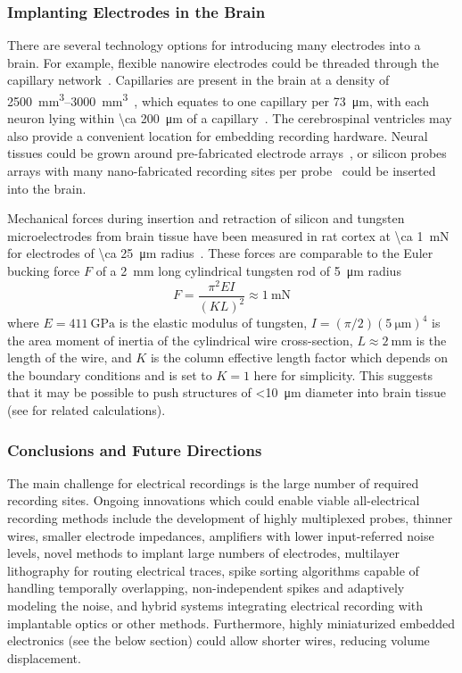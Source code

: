 \subsubsection{Implanting Electrodes in the Brain}

There are several technology options for introducing many electrodes into a brain.
For example, flexible nanowire electrodes could be threaded through the capillary network~\cite{llinas05}.
Capillaries are present in the brain at a density of \SIrange{2500}{3000}{\milli\meter\cubed}~\cite{schmidt89}, which equates to one capillary per \SI{73}{\micro\meter}, with each neuron lying within \SI{\ca 200}{\micro\meter} of a capillary~\cite{loffredo08}. 
The cerebrospinal ventricles may also provide a convenient location for embedding recording hardware.
Neural tissues could be grown around pre-fabricated electrode arrays~\cite{jadhav12}, or silicon probes arrays with many nano-fabricated recording sites per probe~\cite{du11} could be inserted into the brain.

Mechanical forces during insertion and retraction of silicon and tungsten microelectrodes from brain tissue have been measured in rat cortex at \SI{\ca 1}{\milli\newton} for electrodes of \SI{\ca 25}{\micro\meter} radius~\cite{jensen03}.
These forces are comparable to the Euler bucking force $F$ of a \SI{2}{\milli\meter} long cylindrical tungsten rod of \SI{5}{\micro\meter} radius
\[F=\frac{\pi^2 E I}{(K L)^2} \approx \SI{1}{\milli\newton}\]
where $E=\SI{411}{\giga\pascal}$ is the elastic modulus of tungsten, $I=(\pi/2)(\SI{5}{\micro\meter})^4$ is the area moment of inertia of the cylindrical wire cross-section, $L\approx\SI{2}{\milli\meter}$ is the length of the wire, and $K$ is the column effective length factor which depends on the boundary conditions and is set to $K=1$ here for simplicity.
This suggests that it may be possible to push structures of \SI{<10}{\micro\meter} diameter into brain tissue (see \cite{najafi90} for related calculations).

\subsubsection{Conclusions and Future Directions}

The main challenge for electrical recordings is the large number of required recording sites.
Ongoing innovations which could enable viable all-electrical recording methods include
the development of highly multiplexed probes, thinner wires, smaller electrode impedances,
amplifiers with lower input-referred noise levels, novel methods to implant large numbers of electrodes,
multilayer lithography for routing electrical traces, spike sorting algorithms capable of handling temporally overlapping, non-independent spikes and adaptively modeling the noise, and hybrid systems integrating electrical recording with
implantable optics or other methods.
Furthermore, highly miniaturized embedded electronics (see the below section) could allow shorter wires, reducing volume displacement.

